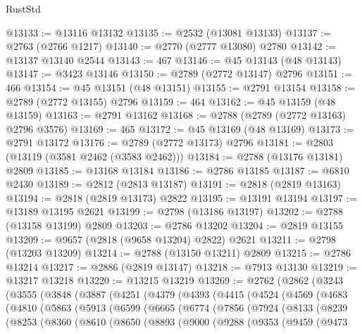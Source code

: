 \begin{lexlean}{RustStd}
\begin{coremodule}
@13133 := @13116 @13132
@13135 := @2532 (@13081 @13133)
@13137 := @2763 (@2766 @1217)
@13140 := @2770 (@2777 @13080) @2780
@13142 := @13137 @13140 @2544
@13143 := 467
@13146 := @45 @13143 (@48 @13143)
@13147 := @3423 @13146
@13150 := @2789 (@2772 @13147) @2796
@13151 := 466
@13154 := @45 @13151 (@48 @13151)
@13155 := @2791 @13154
@13158 := @2789 (@2772 @13155) @2796
@13159 := 464
@13162 := @45 @13159 (@48 @13159)
@13163 := @2791 @13162
@13168 := @2788 (@2789 (@2772 @13163) @2796 @3576)
@13169 := 465
@13172 := @45 @13169 (@48 @13169)
@13173 := @2791 @13172
@13176 := @2789 (@2772 @13173) @2796
@13181 := @2803 (@13119 (@3581 @2462 (@3583 @2462)))
@13184 := @2788 (@13176 @13181) @2809
@13185 := @13168 @13184
@13186 := @2786 @13185
@13187 := @6810 @2430
@13189 := @2812 (@2813 @13187)
@13191 := @2818 (@2819 @13163)
@13194 := @2818 (@2819 @13173) @2822
@13195 := @13191 @13194
@13197 := @13189 @13195 @2621
@13199 := @2798 (@13186 @13197)
@13202 := @2788 (@13158 @13199) @2809
@13203 := @2786 @13202
@13204 := @2819 @13155
@13209 := @9657 (@2818 (@9658 @13204) @2822) @2621
@13211 := @2798 (@13203 @13209)
@13214 := @2788 (@13150 @13211) @2809
@13215 := @2786 @13214
@13217 := @2886 (@2819 @13147)
@13218 := @7913 @13130
@13219 := @13217 @13218
@13220 := @13215 @13219
@13269 := @2762
    (@2862
      (@3243
        (@3555
          (@3848
            (@3887
              (@4251
                (@4379
                  (@4393
                    (@4415
                      (@4524
                        (@4569
                          (@4683
                            (@4810
                              (@5863
                                (@5913
                                  (@6599
                                    (@6665
                                      (@6774
                                        (@7856
                                          (@7924
                                            (@8133
                                              (@8239
                                                (@8253
                                                  (@8360
                                                    (@8610
                                                      (@8650
                                                        (@8893
                                                          (@9000
                                                            (@9288
                                                              (@9353
                                                                (@9459
                                                                  (@9473

\end{coremodule}
\end{lexlean}
